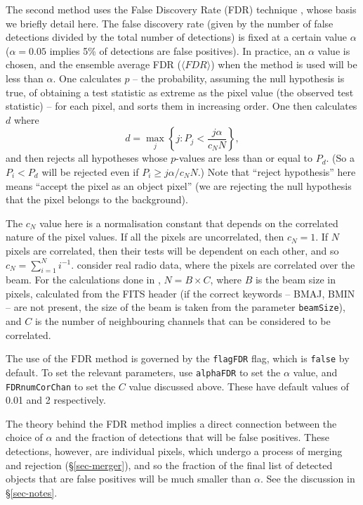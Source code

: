 The second method uses the False Discovery Rate (FDR) technique
\citep{miller01,hopkins02}, whose basis we briefly detail here. The
false discovery rate (given by the number of false detections divided
by the total number of detections) is fixed at a certain value
$\alpha$ (\eg $\alpha=0.05$ implies 5\% of detections are false
positives). In practice, an $\alpha$ value is chosen, and the ensemble
average FDR (\ie $\langle FDR \rangle$) when the method is used will
be less than $\alpha$.  One calculates $p$ -- the probability,
assuming the null hypothesis is true, of obtaining a test statistic as
extreme as the pixel value (the observed test statistic) -- for each
pixel, and sorts them in increasing order. One then calculates $d$
where
\[
d = \max_j \left\{ j : P_j < \frac{j\alpha}{c_N N} \right\},
\]
and then rejects all hypotheses whose $p$-values are less than or
equal to $P_d$. (So a $P_i<P_d$ will be rejected even if $P_i \geq
j\alpha/c_N N$.) Note that ``reject hypothesis'' here means ``accept
the pixel as an object pixel'' (\ie we are rejecting the null
hypothesis that the pixel belongs to the background).

The $c_N$ value here is a normalisation constant that depends on the
correlated nature of the pixel values. If all the pixels are
uncorrelated, then $c_N=1$. If $N$ pixels are correlated, then their
tests will be dependent on each other, and so $c_N = \sum_{i=1}^N
i^{-1}$. \citet{hopkins02} consider real radio data, where the pixels
are correlated over the beam. For the calculations done in \duchamp,
$N = B \times C$, where $B$ is the beam size in pixels, calculated
from the FITS header (if the correct keywords -- BMAJ, BMIN -- are not
present, the size of the beam is taken from the parameter
\texttt{beamSize}), and $C$ is the number of neighbouring channels
that can be considered to be correlated.

The use of the FDR method is governed by the \texttt{flagFDR} flag,
which is \texttt{false} by default. To set the relevant parameters,
use \texttt{alphaFDR} to set the $\alpha$ value, and
\texttt{FDRnumCorChan} to set the $C$ value discussed above. These
have default values of 0.01 and 2 respectively.

The theory behind the FDR method implies a direct connection between
the choice of $\alpha$ and the fraction of detections that will be
false positives. These detections, however, are individual pixels,
which undergo a process of merging and rejection (\S\ref{sec-merger}),
and so the fraction of the final list of detected objects that are
false positives will be much smaller than $\alpha$. See the discussion
in \S\ref{sec-notes}.

